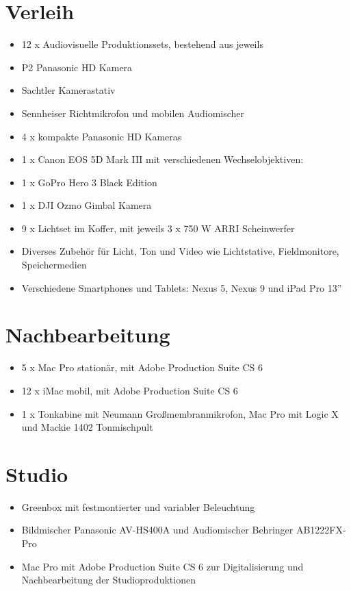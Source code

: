 \section{Verleih}\label{verleih}

\begin{itemize}
\tightlist
\item
  12 x Audiovisuelle Produktionssets, bestehend aus jeweils
\item
  P2 Panasonic HD Kamera
\item
  Sachtler Kamerastativ
\item
  Sennheiser Richtmikrofon und mobilen Audiomischer
\item
  4 x kompakte Panasonic HD Kameras
\item
  1 x Canon EOS 5D Mark III mit verschiedenen Wechselobjektiven:
\item
  1 x GoPro Hero 3 Black Edition
\item
  1 x DJI Ozmo Gimbal Kamera
\item
  9 x Lichtset im Koffer, mit jeweils 3 x 750 W ARRI Scheinwerfer
\item
  Diverses Zubehör für Licht, Ton und Video wie Lichtstative,
  Fieldmonitore, Speichermedien
\item
  Verschiedene Smartphones und Tablets: Nexus 5, Nexus 9 und iPad Pro
  13''
\end{itemize}

\section{Nachbearbeitung}\label{nachbearbeitung}

\begin{itemize}
\tightlist
\item
  5 x Mac Pro stationär, mit Adobe Production Suite CS 6
\item
  12 x iMac mobil, mit Adobe Production Suite CS 6
\item
  1 x Tonkabine mit Neumann Großmembranmikrofon, Mac Pro mit Logic X und
  Mackie 1402 Tonmischpult
\end{itemize}

\section{Studio}\label{studio}

\begin{itemize}
\tightlist
\item
  Greenbox mit festmontierter und variabler Beleuchtung
\item
  Bildmischer Panasonic AV-HS400A und Audiomischer Behringer
  AB1222FX-Pro
\item
  Mac Pro mit Adobe Production Suite CS 6 zur Digitalisierung und
  Nachbearbeitung der Studioproduktionen
\end{itemize}

